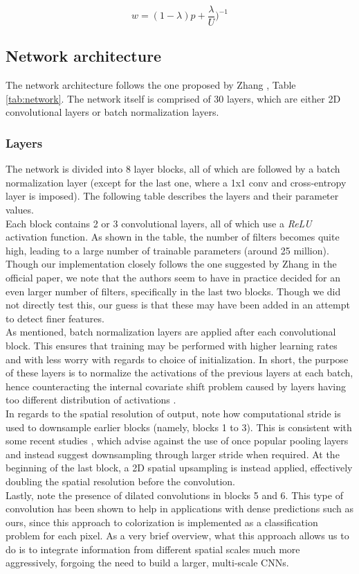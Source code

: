 \documentclass[twoside,twocolumn]{article}
\begin{document}
\begin{equation}
w = (1 - \lambda)p + \frac{\lambda}{U})^{-1}
\end{equation}


\subsection{Network architecture}

The network architecture follows the one proposed by Zhang \cite{Zhang:2016}, Table \ref{tab:network}. The network itself is comprised of 30 layers, which are either 2D convolutional layers or batch normalization layers.


\subsubsection{Layers}
The network is divided into 8 layer blocks, all of which are followed by a batch normalization layer (except for the last one, where a 1x1 conv and cross-entropy layer is imposed). The following table describes the layers and their parameter values.\\
Each block contains 2 or 3 convolutional layers, all of which use a \textit{ReLU} activation function. As shown in the table, the number of filters becomes quite high, leading to a large number of trainable parameters (around 25 million). Though our implementation closely follows the one suggested by Zhang \cite{Zhang:2016} in the official paper, we note that the authors seem to have in practice decided for an even larger number of filters, specifically in the last two blocks. Though we did not directly test this, our guess is that these may have been added in an attempt to detect finer features.\\
As mentioned, batch normalization layers are applied after each convolutional block. This ensures that training may be performed with higher learning rates and with less worry with regards to choice of initialization. In short, the purpose of these layers is to normalize the activations of the previous layers at each batch, hence counteracting the internal covariate shift problem caused by layers having too different distribution of activations \cite{Sergey:2015}.\\
In regards to the spatial resolution of output, note how computational stride is used to downsample earlier blocks (namely, blocks 1 to 3). This is consistent with some recent studies \cite{Jost:2015}, which advise against the use of once popular pooling layers and instead suggest downsampling through larger stride when required. At the beginning of the last block, a 2D spatial upsampling is instead applied, effectively doubling the spatial resolution before the convolution. \\
Lastly, note the presence of dilated convolutions \cite{Fisher:2016} in blocks 5 and 6. This type of convolution has been shown to help in applications with dense predictions such as ours, since this approach to colorization is implemented as a classification problem for each pixel. As a very brief overview, what this approach allows us to do is to integrate information from different spatial scales much more aggressively,  forgoing the need to build a larger, multi-scale CNNs.
\end{document}
